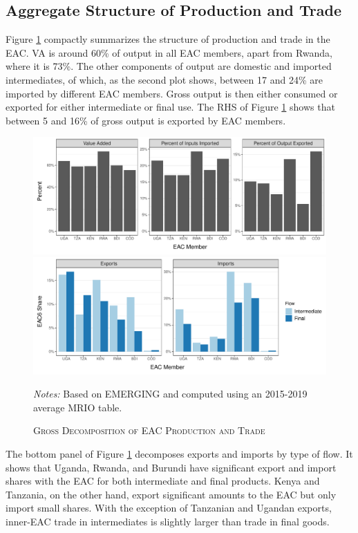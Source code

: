 \documentclass[a4paper]{article}
\begin{document}
\subsection{Aggregate Structure of Production and Trade}

Figure \ref{fig:shares_ag} compactly summarizes the structure of production and trade in the EAC. VA is around 60\% of output in all EAC members, apart from Rwanda, where it is 73\%. The other components of output are domestic and imported intermediates, of which, as the second plot shows, between 17 and 24\% are imported by different EAC members. Gross output is then either consumed or exported for either intermediate or final use. The RHS of Figure \ref{fig:shares_ag} shows that between 5 and 16\% of gross output is exported by EAC members. 

\begin{figure}[h!] 
\centering
\caption{\label{fig:shares_ag}\textsc{Gross Decomposition of EAC Production and Trade}}
\vspace{2mm}
\includegraphics[width=1\textwidth, trim= {0 1cm 0 0}, clip]{"EM_gross_shares_ag.pdf"} \includegraphics[width=1\textwidth, trim= {0 0 0 0}, clip]{"EM_gross_trade_shares_ag.pdf"} \\
\raggedright
\scriptsize
\emph{Notes:} Based on EMERGING and computed using an 2015-2019 average MRIO table. 
\end{figure}
\FloatBarrier

The bottom panel of Figure \ref{fig:shares_ag} decomposes exports and imports by type of flow. It shows that Uganda, Rwanda, and Burundi have significant export and import shares with the EAC for both intermediate and final products. Kenya and Tanzania, on the other hand, export significant amounts to the EAC but only import small shares. With the exception of Tanzanian and Ugandan exports, inner-EAC trade in intermediates is slightly larger than trade in final goods. 
\end{document}
